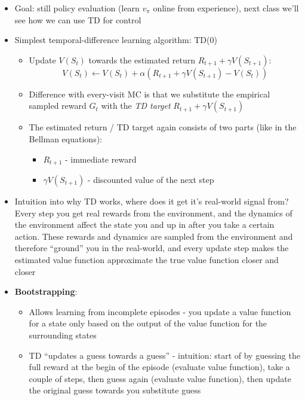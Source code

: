 \documentclass{article}
\begin{document}
\begin{itemize}
    \item Goal: still policy evaluation (learn $v_\pi$ online from experience), next class we'll see how we can use TD for control
    \item Simplest temporal-difference learning algorithm: TD(0)
    \begin{itemize}
        \item Update $V(S_t)$ towards the estimated return $R_{t+1}+\gamma V(S_{t+1})$:
        \begin{equation}
            V(S_t) \leftarrow V(S_t) + \alpha(R_{t+1}+\gamma V(S_{t+1})-V(S_t)) 
        \end{equation}
        \item Difference with every-visit MC is that we substitute the empirical sampled reward $G_t$ with the \textit{TD target} $R_{t+1}+\gamma V(S_{t+1})$
        \item The estimated return / TD target again consists of two parts (like in the Bellman equations):
        \begin{itemize}
            \item $R_{t+1}$ - immediate reward
            \item $\gamma V(S_{t+1})$ - discounted value of the next step
        \end{itemize}
    \end{itemize}
    \item Intuition into why TD works, where does it get it's real-world signal from? Every step you get real rewards from the environment, and the dynamics of the environment affect the state you and up in after you take a certain action. These rewards and dynamics are sampled from the environment and therefore ``ground'' you in the real-world, and every update step makes the estimated value function approximate the true value function closer and closer
    \item \textbf{Bootstrapping}:
    \begin{itemize}
        \item Allows learning from incomplete episodes - you update a value function for a state only based on the output of the value function for the surrounding states
        \item TD ``updates a guess towards a guess'' - intuition: start of by guessing the full reward at the begin of the episode (evaluate value function), take a couple of steps, then guess again (evaluate value function), then update the original guess towards you substitute guess

\end{itemize}
\end{itemize}
\end{document}
